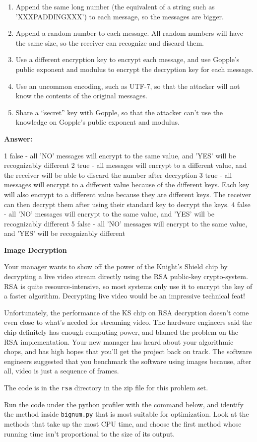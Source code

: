 \documentclass[12pt,twoside]{article}
\newcommand{\answer}{
 \par\medskip
 \textbf{Answer:}
}
\newcommand{\answerIIf}{ \answer
1 false - all 'NO' messages will encrypt to the same value, and 'YES' will be recognizably different
2 true - all messages will encrypt to a different value, and the receiver will
         be able to discard the number after decryption
3 true - all messages will encrypt to a different value because of the different keys.
         Each key will also encrypt to a different value because they are different keys.
         The receiver can then decrypt them after using their standard key to decrypt the keys.
4 false - all 'NO' messages will encrypt to the same value, and 'YES' will be recognizably different
5 false - all 'NO' messages will encrypt to the same value, and 'YES' will be recognizably different
}
\begin{document}
\begin{problems}
\begin {problemparts}
\begin{enumerate}
  \item Append the same long number (the equivalent of a string such as
  'XXXPADDINGXXX') to each message, so the messages are bigger.
  \item Append a random number to each message. All random numbers will have the
  same size, so the receiver can recognize and discard them.
  \item Use a different encryption key to encrypt each message, and use Gopple's
  public exponent and modulus to encrypt the decryption key for each message.
  \item Use an uncommon encoding, such as UTF-7, so that the attacker will not
  know the contents of the original messages.
  \item Share a ``secret'' key with Gopple, so that the attacker can't use the
  knowledge on Gopple's public exponent and modulus.
\end{enumerate}
\answerIIf

\end{problemparts}

\newpage

\problem {} \textbf{Image Decryption}

Your manager wants to show off the power of the Knight's Shield chip by
decrypting a live video stream directly using the RSA public-key crypto-system.
RSA is quite resource-intensive, so most systems only use it to encrypt the key
of a faster algorithm. Decrypting live video would be an impressive technical
feat!

Unfortunately, the performance of the KS chip on RSA decryption doesn't come
even close to what's needed for streaming video. The hardware engineers said the
chip definitely has enough computing power, and blamed the problem on the
RSA implementation. Your new manager has heard about your algorithmic chops, and
has high hopes that you'll get the project back on track. The software engineers
suggested that you benchmark the software using images because, after all, video
is just a sequence of frames.

The code is in the \texttt{rsa} directory in the zip file for this problem set.

\begin{problemparts}
\problempart {} Run the code under the python profiler with the command
below, and identify the method inside \texttt{bignum.py} that is most suitable
for optimization. Look at the methods that take up the most CPU time, and
choose the first method whose running time isn't proportional to the size of its
output.


\end{problemparts}
\end{problems}
\end{document}
